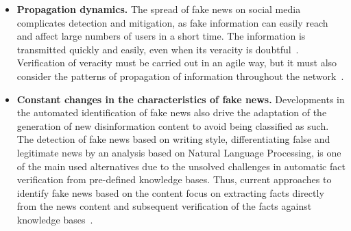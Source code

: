 \documentclass{ieeeaccess}
\begin{document}
\begin{itemize}
\item {\bf Propagation dynamics.} The spread of fake news on social media complicates detection and mitigation, as fake information can easily reach and affect large numbers of users in a short time. The information is transmitted quickly and easily, even when its veracity is doubtful~\cite{friggeri2014}. Verification of veracity must be carried out in an agile way, but it must also consider the patterns of propagation of information throughout the network~\cite{meel2020}.


\item{\bf Constant changes in the characteristics of fake news.} Developments in the automated identification of fake news also drive the adaptation of the generation of new disinformation content to avoid being classified as such. The detection of fake news based on writing style, differentiating false and legitimate news by an analysis based on Natural Language Processing, is one of the main used alternatives due to the unsolved challenges in automatic fact verification from pre-defined knowledge bases. Thus, current approaches to identify fake news based on the content focus on extracting facts directly from the news content and subsequent verification of the facts against knowledge bases~\cite{ciot-nicollas-2020}.




\end{itemize}
\end{document}
